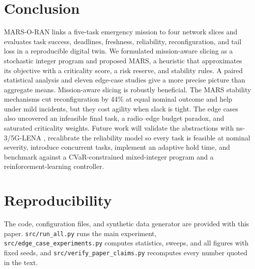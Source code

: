 \documentclass[conference]{IEEEtran}
\begin{document}
\section{Conclusion}
MARS-O-RAN links a five-task emergency mission to four network slices and evaluates task success, deadlines, freshness, reliability, reconfiguration, and tail loss in a reproducible digital twin. We formulated mission-aware slicing as a stochastic integer program and proposed MARS, a heuristic that approximates its objective with a criticality score, a risk reserve, and stability rules. A paired statistical analysis and eleven edge-case studies give a more precise picture than aggregate means. Mission-aware slicing is robustly beneficial. The MARS stability mechanisms cut reconfiguration by 44\% at equal nominal outcome and help under mild incidents, but they cost agility when slack is tight. The edge cases also uncovered an infeasible final task, a radio--edge budget paradox, and saturated criticality weights. Future work will validate the abstractions with ns-3/5G-LENA \cite{lena}, recalibrate the reliability model so every task is feasible at nominal severity, introduce concurrent tasks, implement an adaptive hold time, and benchmark against a CVaR-constrained mixed-integer program and a reinforcement-learning controller.

\section*{Reproducibility}
The code, configuration files, and synthetic data generator are provided with this paper. \texttt{src/run\_all.py} runs the main experiment, \texttt{src/edge\_case\_experiments.py} computes statistics, sweeps, and all figures with fixed seeds, and \texttt{src/verify\_paper\_claims.py} recomputes every number quoted in the text.
\end{document}
